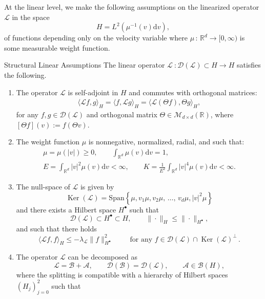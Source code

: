 \documentclass[AHL,Unicode,longabstracts,published]{cedram}
\DeclareMathOperator{\nul}{Ker}
\renewcommand{\d}{\mathrm{d}}
\newcommand{\rSpan}{\mathrm{Span}}
\newcommand{\R}{\mathbb{R}}
\renewcommand{\AA}{\mathcal{A}}
\newcommand{\BB}{\mathcal{B}}
\newcommand{\LL}{\mathcal{L}}
\newcommand{\dom}{\mathscr{D}}
\newcommand{\BBB}{\mathscr{B}}
\newcommand{\MMM}{\mathscr{M}}
\newcommand{\Ss}{H}
\newcommand{\Ssp}{H^{\bullet}}
\renewcommand*\le{\leqslant}
\renewcommand*\ge{\geqslant}
\newcommand{\la}{\langle}
\newcommand{\ra}{\rangle}
\newcommand*{\relabel}{\renewcommand{\labelenumi}{(\theenumi)}}
\newcommand*{\Lenumi}{\renewcommand*{\theenumi}{\textbf{L\arabic{enumi}}}\relabel}
\begin{document}
At the linear level, we make the following assumptions on the linearized operator $\LL$ in the space
\[
\Ss=L^{2}\left(\mu^{-1}(v)\d v\right),
\]
of functions depending only on the velocity variable where $\mu \, : \, \R^d \to [0,\infty)$ is some measurable weight function.

\begin{enonce}{Structural Linear Assumptions}\label{AsL1}
The linear operator $\LL\::\dom(\LL) \subset \Ss \to \Ss$ satisfies the following.
\begin{enumerate}\Lenumi
\item \label{L1}
The operator $\LL$ is self-adjoint in $\Ss$ and commutes with orthogonal matrices:
\begin{gather*}
\langle \LL f, g \rangle_{\Ss} = \langle f, \LL g \rangle_{\Ss} = \langle \LL ({\Theta}f), \Theta g \rangle_\Ss,
\end{gather*}
for any $f, g \in \dom(\LL)$ and orthogonal matrix $\Theta \in \MMM_{d \times d}(\R)$, where $[\Theta f](v):=f(\Theta v)$.
\item \label{L2}
The weight function $\mu$ is nonnegative, normalized, radial, and such that:
\begin{gather*}
\mu=\mu(|v|) \ge 0, \qquad \int_{\R^d} \mu(v) \d v = 1,\\
E = \int_{\R^d} |v|^2 \mu(v) \d v < \infty, \qquad K = \frac{1}{E^2} \int_{\R^d} | v |^4 \mu(v) \d v < \infty.
\end{gather*}
\item \label{L3}
The null-space of $\LL$ is given by
\begin{equation*}
\nul\left(\LL \right) =\rSpan\left\{ \mu, v_1 \mu, v_2 \mu, \,\dots,\,v_d \mu, |v|^2 \mu \right\}
\end{equation*}
and there exists a Hilbert space $\Ssp$ such that
\begin{equation*}
\dom(\LL) \subset \Ssp \subset \Ss, \qquad \| \cdot \|_{\Ss} \le \| \cdot \|_{\Ssp},
\end{equation*}
and such that there holds
\begin{equation*}
\la \LL f, f \ra_{\Ss} \le - \lambda_\LL \| f \|^2_{\Ssp} \qquad \text{ for any } f \in \dom(\LL) \cap \nul\left(\LL \right)^\perp\,.
\end{equation*}
\item \label{L4}
The operator $\LL$ can be decomposed as
\[
\LL = \BB+ \AA, \qquad \dom(\BB)=\dom(\LL), \qquad \AA \in \BBB(\Ss),
\]
where the splitting is compatible with a hierarchy of Hilbert spaces $(\Ss_j)_{j=0}^{2}$ such that

\end{enumerate}
\end{enonce}
\end{document}

